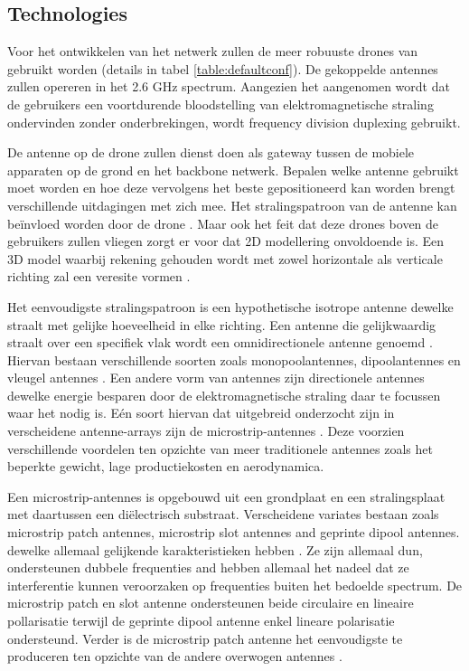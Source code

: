 \documentclass[twocolumn]{phdsymp} %
\begin{document}
\subsection{Technologies}
Voor het ontwikkelen van het netwerk zullen de meer robuuste drones van \cite{J2} gebruikt worden (details in tabel \ref{table:defaultconf}). De 
gekoppelde antennes zullen opereren in het 2.6 GHz spectrum. Aangezien het aangenomen wordt dat de gebruikers een voortdurende bloodstelling
van  elektromagnetische straling ondervinden zonder onderbrekingen, wordt frequency division duplexing gebruikt. 

De antenne op de drone zullen dienst doen als gateway tussen de mobiele apparaten op de grond en het backbone netwerk.
Bepalen welke antenne gebruikt moet worden en hoe deze vervolgens het beste gepositioneerd kan worden brengt 
verschillende uitdagingen met zich mee. Het stralingspatroon van de antenne kan be\"invloed worden door de drone \cite{A1}.
Maar ook het feit dat deze drones boven de gebruikers zullen vliegen zorgt er voor dat 2D modellering onvoldoende is.
Een 3D model waarbij rekening gehouden wordt met zowel horizontale als verticale richting zal een veresite vormen \cite{U12}.

Het eenvoudigste stralingspatroon is een hypothetische isotrope antenne dewelke straalt met gelijke hoeveelheid in elke richting.
Een antenne die gelijkwaardig straalt over een specifiek vlak wordt een omnidirectionele antenne genoemd 
\cite{U12}. Hiervan bestaan verschillende soorten zoals monopoolantennes, dipoolantennes en vleugel antennes \cite{A4,A10,A11,A12}.
Een andere vorm van antennes zijn directionele antennes dewelke energie besparen door de elektromagnetische straling daar 
te focussen waar het nodig is. Eén soort hiervan dat uitgebreid onderzocht  zijn in verscheidene antenne-arrays 
zijn de microstrip-antennes \cite{A5,A6,A8}.
Deze voorzien verschillende voordelen ten opzichte van meer traditionele antennes 
\cite{J13_microstripadvantages,J14_antennadesign} zoals het beperkte gewicht, lage productiekosten en aerodynamica.

Een microstrip-antennes is opgebouwd uit een grondplaat en een stralingsplaat met daartussen een di\"electrisch substraat.
Verscheidene variates bestaan zoals microstrip patch antennes, microstrip slot antennes and geprinte dipool antennes. 
dewelke allemaal gelijkende karakteristieken hebben \cite{J13_microstripadvantages,J14_antennadesign}. 
Ze zijn allemaal dun, ondersteunen dubbele frequenties and hebben allemaal het nadeel dat 
ze interferentie kunnen veroorzaken op frequenties buiten het bedoelde spectrum. 
De microstrip patch en slot antenne ondersteunen beide circulaire en lineaire pollarisatie terwijl de geprinte dipool antenne enkel 
lineare polarisatie ondersteund. Verder is de microstrip patch antenne het eenvoudigste te produceren ten opzichte 
van de andere overwogen antennes \cite{J13_microstripadvantages}. 
\end{document}
